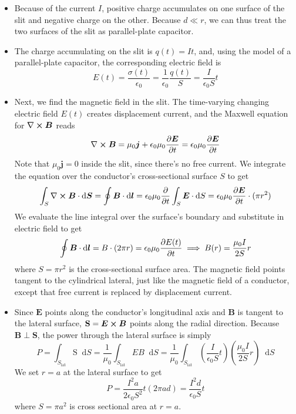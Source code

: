 \documentclass[11pt, a4paper]{article}
\newcommand{\diff}{\mathop{}\!\mathrm{d}} %
\renewcommand{\vec}[1]{\bm{#1}} %
\newcommand{\E}{\vec{E}}  %
\newcommand{\B}{\vec{B}}  %
\renewcommand{\S}{\mathbf{S}}  %
\renewcommand{\SS}{\mathrm{S}}  %
\newcommand{\ee}{\epsilon_{0}}  %
\newcommand{\mm}{\mu_{0}}  %
\newcommand{\m}{\vec{m}}  %
\renewcommand{\curl}{\nabla \cross}
\begin{document}
\begin{itemize}
	\item Because of the current $ I $, positive charge accumulates on one surface of the slit and negative charge on the other. Because $ d \ll r $, we can thus treat the two surfaces of the slit as parallel-plate capacitor. 
	
	\item The charge accumulating on the slit is $ q(t) = It $, and, using the model of a parallel-plate capacitor, the corresponding electric field is
	\begin{equation*}
		E(t) = \frac{\sigma(t)}{\ee} = \frac{1}{\ee}\frac{q(t)}{S} = \frac{I}{\ee S}t
	\end{equation*}
	
	\item Next, we find the magnetic field in the slit. The time-varying changing electric field $ E(t) $ creates displacement current, and the Maxwell equation for $ \curl \B $ reads
	\begin{equation*}
		\curl \B  = \mm \vec{j} + \ee\mm \pdv{\E}{t} = \ee\mm \pdv{\E}{t}
	\end{equation*}
	Note that $ \mm \vec{j} = 0 $ inside the slit, since there's no free current. We integrate the equation over the conductor's cross-sectional surface $ S $ to get
	\begin{equation*}
		\int_{S} \curl \B \cdot \diff \vec{S} = \oint \B \cdot \diff \vec{l}  = \ee \mm \pdv{t}\int_{S}\E\cdot \diff S =  \ee \mm \pdv{\E}{t} \cdot (\pi r^{2})
	\end{equation*}
	We evaluate the line integral over the surface's boundary and substitute in electric field to get
	\begin{equation*}
		\oint \B \cdot \diff \vec{l} = B \cdot (2\pi r) = \ee \mm \pdv{E(t)}{t} \implies B(r) = \frac{\mm I}{2S} r
	\end{equation*}
	where $ S = \pi r^{2} $ is the cross-sectional surface area. The magnetic field points tangent to the cylindrical lateral, just like the magnetic field of a conductor, except that free current is replaced by displacement current. 
	
	
	\item Since $ \E $ points along the conductor's longitudinal axis and $ \B $ is tangent to the lateral surface, $ \S = \E \cross \B $ points along the radial direction. Because $ \B \perp \S$, the power through the lateral surface is simply
	\begin{equation*}
		P = \int_{S_{\text{lat}}} \SS \diff S = \frac{1}{\mm}\int_{S_\text{lat}} EB \diff S = \frac{1}{\mm} \int_{S_{\text{lat}}}  \left(\frac{I}{\ee S}t\right)\left(\frac{\mm I}{2S} r\right) \diff S
	\end{equation*}
	We set $ r = a $ at the lateral surface to get
	\begin{equation*}
		P = \frac{I^{2}a}{2\ee S^{2}}t (2\pi a d) = \frac{I^{2}d}{\ee S} t
	\end{equation*}
	where $ S = \pi a^{2} $ is cross sectional area at $ r = a $.
	

\end{itemize}
\end{document}
